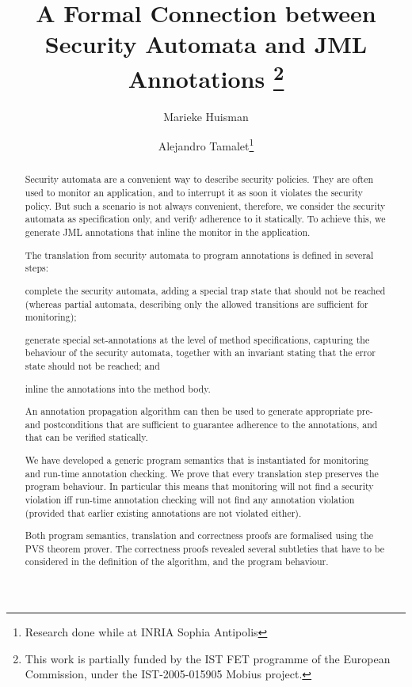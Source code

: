 \documentclass[]{llncs}
\title{A Formal Connection between Security Automata and JML Annotations
\thanks{This work is partially funded by the IST FET
programme of the European Commission, under the IST-2005-015905
\textsf{Mobius} project.}}
\author{Marieke Huisman\inst{1} \and Alejandro Tamalet\inst{2}\thanks{Research done while at INRIA Sophia Antipolis}}
\institute{INRIA Sophia Antipolis, France \and
University of Nijmegen, Netherlands}
\begin{document}
\maketitle
\begin{abstract}
Security automata are a convenient way to describe security
policies. They are often used to monitor an application, and to
interrupt it as soon it violates the security policy. But such a
scenario is not always convenient, therefore, we consider the security
automata as specification only, and verify adherence to it
statically. To achieve this, we generate JML annotations that inline
the monitor in the application.

The translation from security automata to program annotations is
defined in several steps:
\begin{inparaenum}
\item complete the security automata, adding a special trap
state that should not be reached (whereas partial automata, describing
only the allowed transitions are sufficient for monitoring);
\item generate special set-annotations at the level of method
specifications, capturing the behaviour of the security automata,
together with an invariant stating that the error state should not be
reached; and
\item inline the annotations into the method body.
\end{inparaenum}
An annotation propagation algorithm can then be used to generate
appropriate pre- and postconditions that are sufficient to guarantee
adherence to the annotations, and that can be verified statically.

We have developed a generic program semantics that is instantiated for
monitoring and run-time annotation checking. We prove that every
translation step preserves the program behaviour. In particular this
means that monitoring will not find a security violation iff run-time
annotation checking will not find any annotation violation (provided
that earlier existing annotations are not violated either). 

Both program semantics, translation and correctness proofs are
formalised using the PVS theorem prover. The correctness proofs
revealed several subtleties that have to be considered in the
definition of the algorithm, and the program behaviour.




\end{abstract}











\end{document}
